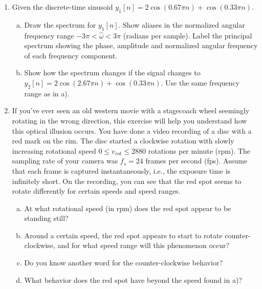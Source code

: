 \begin{enumerate}
  \item Given the discrete-time sinusoid $y_1[n] = 2 \cos(0.67 \pi n) + \cos(0.33 \pi n)$.
        \begin{enumerate}[a)]
          \item Draw the spectrum for $y_1[n]$. Show aliases in the normalized angular 
                frequency range $-3\pi < \hat{\omega} < 3\pi$ (radians per sample). 
                Label the principal spectrum showing the phase, amplitude and normalized 
                angular frequency of each frequency component.
          \item Show how the spectrum changes if the signal changes to 
                $y_2[n] = 2 \cos(2.67 \pi n) + \cos(0.33 \pi n)$. 
                Use the same frequency range as in a).
        \end{enumerate}

  \item If you've ever seen an old western movie with a stagecoach wheel seemingly 
        rotating in the wrong direction, this exercise will help you understand how 
        this optical illusion occurs. You have done a video recording of a disc with a 
        red mark on the rim. The disc started a clockwise rotation with slowly 
        increasing rotational speed $0 \le v_{rot} \le 2880$ rotations per minute (rpm). 
        The sampling rate of your camera was $f_s = 24$ frames per second (fps). 
        Assume that each frame is captured instantaneously, i.e., the exposure time is 
        infinitely short. On the recording, you can see that the red spot seems to 
        rotate differently for certain speeds and speed ranges.
        \begin{enumerate}[a)]
          \item At what rotational speed (in rpm) does the red spot appear to be standing still?
          \item Around a certain speed, the red spot appears to start to rotate 
                counter-clockwise, and for what speed range will this phenomenon occur?
          \item Do you know another word for the counter-clockwise behavior?
          \item What behavior does the red spot have beyond the speed found in a)?
        \end{enumerate}


\end{enumerate}
